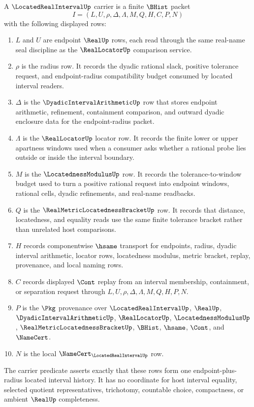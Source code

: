 \begin{definition}
\label{def:located-real-interval-carrier}
A $\LocatedRealIntervalUp$ carrier is a finite $\BHist$ packet
$$
I=(L,U,\rho,\Delta,\Lambda,M,Q,H,C,P,N)
$$
with the following displayed rows:
\begin{enumerate}
\item $L$ and $U$ are endpoint $\RealUp$ rows, each read through the same real-name seal discipline as the $\RealLocatorUp$ comparison service.
\item $\rho$ is the radius row. It records the dyadic rational slack, positive tolerance request, and endpoint-radius compatibility budget consumed by located interval readers.
\item $\Delta$ is the $\DyadicIntervalArithmeticUp$ row that stores endpoint arithmetic, refinement, containment comparison, and outward dyadic enclosure data for the endpoint-radius packet.
\item $\Lambda$ is the $\RealLocatorUp$ locator row. It records the finite lower or upper apartness windows used when a consumer asks whether a rational probe lies outside or inside the interval boundary.
\item $M$ is the $\LocatednessModulusUp$ row. It records the tolerance-to-window budget used to turn a positive rational request into endpoint windows, rational cells, dyadic refinements, and real-name readbacks.
\item $Q$ is the $\RealMetricLocatednessBracketUp$ row. It records that distance, locatedness, and equality reads use the same finite tolerance bracket rather than unrelated host comparisons.
\item $H$ records componentwise $\hsame$ transport for endpoints, radius, dyadic interval arithmetic, locator rows, locatedness modulus, metric bracket, replay, provenance, and local naming rows.
\item $C$ records displayed $\Cont$ replay from an interval membership, containment, or separation request through $L,U,\rho,\Delta,\Lambda,M,Q,H,P,N$.
\item $P$ is the $\Pkg$ provenance over $\LocatedRealIntervalUp$, $\RealUp$, $\DyadicIntervalArithmeticUp$, $\RealLocatorUp$, $\LocatednessModulusUp$, $\RealMetricLocatednessBracketUp$, $\BHist$, $\hsame$, $\Cont$, and $\NameCert$.
\item $N$ is the local $\NameCert_{\LocatedRealIntervalUp}$ row.
\end{enumerate}
The carrier predicate asserts exactly that these rows form one endpoint-plus-radius located interval history. It has no coordinate for host interval equality, selected quotient representatives, trichotomy, countable choice, compactness, or ambient $\RealUp$ completeness.
\end{definition}

